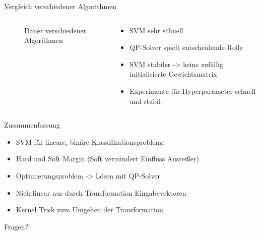 \documentclass[ngerman]{beamer}
\begin{document}
\begin{frame}{Vergleich verschiedener Algorithmen}
\begin{columns}
\begin{column}{0.4\textwidth}
\begin{figure}
                \caption{Dauer verschiedener Algorithmen}
                \label{fig:daueralgos}
            \end{figure}
        \end{column} \pause
        \begin{column}{0.6\textwidth}
            \begin{itemize}
                \item SVM sehr schnell \pause
                \item QP-Solver spielt entscheidende Rolle \pause
                \item SVM stabiler -> keine zufällig initialisierte Gewichtsmatrix \pause
                \item Experimente für Hyperparameter schnell und stabil
            \end{itemize}
        \end{column}
    \end{columns}
\end{frame}

\begin{frame}{Zusammenfassung}
    \centering
    \begin{itemize}
        \item SVM für lineare, binäre Klassifikationsprobleme \pause
        \item Hard und Soft Margin (Soft vermindert Einfluss Ausreißer) \pause
        \item Optimierungsproblem -> Lösen mit QP-Solver \pause
        \item Nichtlinear nur durch Transformation Eingabevektoren \pause
        \item Kernel Trick zum Umgehen der Transformation
    \end{itemize}

\end{frame}

\begin{frame}[standout]
	Fragen?
\end{frame}
\end{document}
